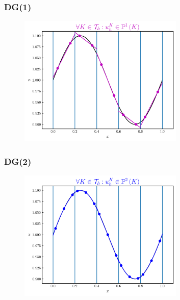 \documentclass{beamer}
\begin{document}
\begin{frame}
\frametitle{DG(1)}

  \begin{figure}[htb!]
    \centering
    \includegraphics[width=0.7\textwidth]{fig.sine_k1.png}
  \end{figure}

\end{frame}

\begin{frame}
\frametitle{DG(2)}

  \begin{figure}[htb!]
    \centering
    \includegraphics[width=0.7\textwidth]{fig.sine_k2.png}
  \end{figure}

\end{frame}
\end{document}
